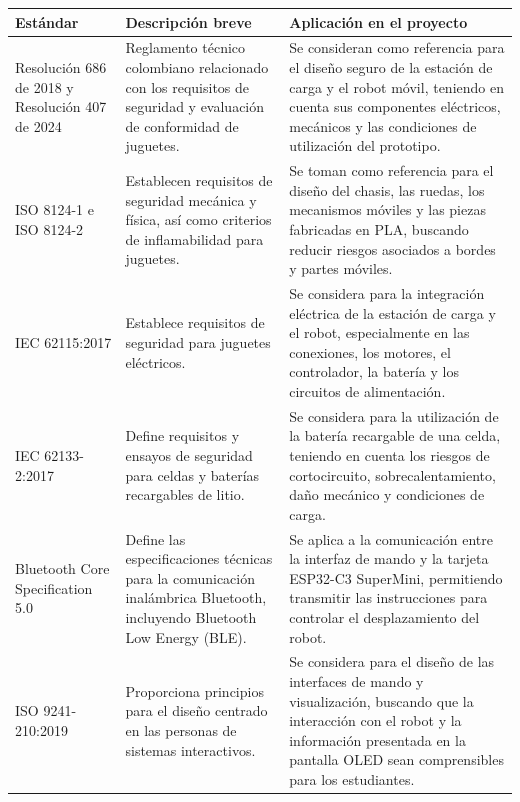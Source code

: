 \documentclass[11pt]{article}
\begin{document}
\begin{table}[H]
\centering
\renewcommand{\arraystretch}{1.2}

\begin{tabular}{|p{3.5cm}|p{5cm}|p{7cm}|}
\hline
\textbf{Estándar} &
\textbf{Descripción breve} &
\textbf{Aplicación en el proyecto} \\
\hline

Resolución 686 de 2018 y Resolución 407 de 2024 &
Reglamento técnico colombiano relacionado con los requisitos de seguridad y evaluación de conformidad de juguetes. &
Se consideran como referencia para el diseño seguro de la estación de carga y el robot móvil, teniendo en cuenta sus componentes eléctricos, mecánicos y las condiciones de utilización del prototipo. \\
\hline

ISO 8124-1 e ISO 8124-2 &
Establecen requisitos de seguridad mecánica y física, así como criterios de inflamabilidad para juguetes. &
Se toman como referencia para el diseño del chasis, las ruedas, los mecanismos móviles y las piezas fabricadas en PLA, buscando reducir riesgos asociados a bordes y partes móviles. \\
\hline

IEC 62115:2017 &
Establece requisitos de seguridad para juguetes eléctricos. &
Se considera para la integración eléctrica de la estación de carga y el robot, especialmente en las conexiones, los motores, el controlador, la batería y los circuitos de alimentación. \\
\hline

IEC 62133-2:2017 &
Define requisitos y ensayos de seguridad para celdas y baterías recargables de litio. &
Se considera para la utilización de la batería recargable de una celda, teniendo en cuenta los riesgos de cortocircuito, sobrecalentamiento, daño mecánico y condiciones de carga. \\
\hline

Bluetooth Core Specification 5.0 &
Define las especificaciones técnicas para la comunicación inalámbrica Bluetooth, incluyendo Bluetooth Low Energy (BLE). &
Se aplica a la comunicación entre la interfaz de mando y la tarjeta ESP32-C3 SuperMini, permitiendo transmitir las instrucciones para controlar el desplazamiento del robot. \\
\hline

ISO 9241-210:2019 &
Proporciona principios para el diseño centrado en las personas de sistemas interactivos. &
Se considera para el diseño de las interfaces de mando y visualización, buscando que la interacción con el robot y la información presentada en la pantalla OLED sean comprensibles para los estudiantes. \\
\hline


\end{tabular}
\end{table}
\end{document}
